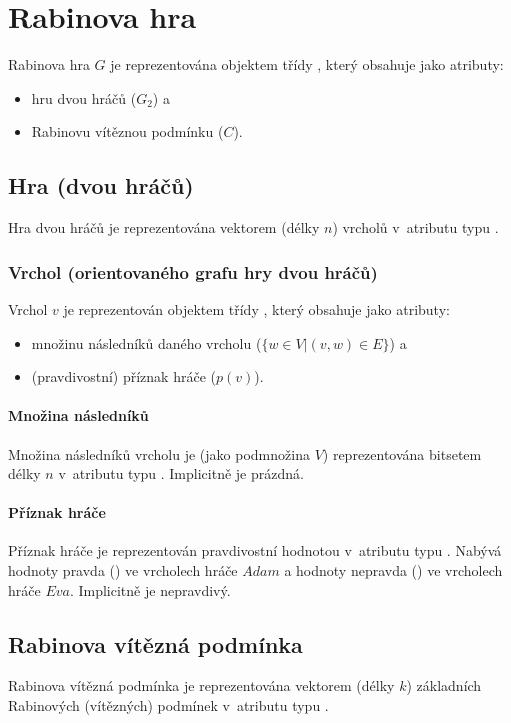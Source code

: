 \section{Rabinova hra}
Rabinova hra $G$ je reprezentována objektem třídy , který obsahuje jako atributy:
\begin{itemize}
\item hru dvou hráčů ($G_2$) a
\item Rabinovu vítěznou podmínku ($C$).
\end{itemize}
\subsection{Hra (dvou hráčů)}
Hra dvou hráčů je reprezentována vektorem (délky $n$) vrcholů v~atributu  typu .
\subsubsection{Vrchol (orientovaného grafu hry dvou hráčů)}
Vrchol $v$ je reprezentován objektem třídy , který obsahuje jako atributy:
\begin{itemize}
\item množinu následníků daného vrcholu ($\{w \in V | (v, w) \in E\}$) a
\item (pravdivostní) příznak hráče ($p(v)$).
\end{itemize}
\paragraph{Množina následníků}
Množina následníků vrcholu je (jako podmnožina $V$) reprezentována bitsetem délky $n$ v~atributu   typu . Implicitně je prázdná.
\paragraph{Příznak hráče}
Příznak hráče je reprezentován pravdivostní hodnotou v~atributu  typu . Nabývá hodnoty pravda () ve vrcholech hráče $Adam$ a hodnoty nepravda () ve vrcholech hráče $Eva$. Implicitně je nepravdivý.
\subsection{Rabinova vítězná podmínka}
Rabinova vítězná podmínka je reprezentována vektorem (délky $k$) základních Rabinových (vítězných) podmínek v~atributu   typu .
